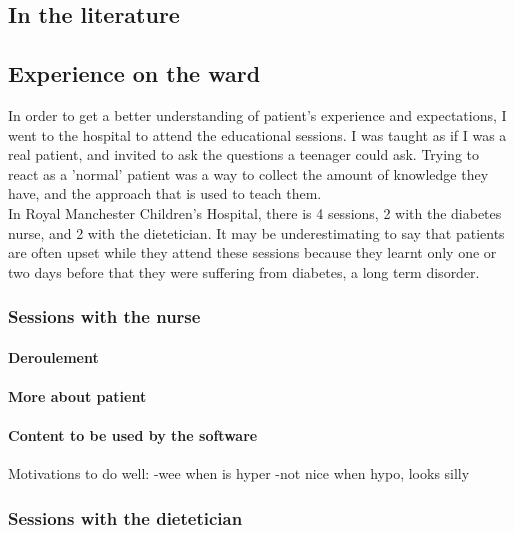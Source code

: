 \subsection{In the literature}
\subsection{Experience on the ward}
In order to get a better understanding of patient's experience and expectations, I went to the hospital to attend the educational sessions. I was taught as if I was a real patient, and invited to ask the questions a teenager could ask. Trying to react as a 'normal' patient was a way to collect the amount of knowledge they have, and the approach that is used to teach them.
\\In Royal Manchester Children’s Hospital, there is 4 sessions, 2 with the diabetes nurse, and 2 with the dietetician. It may be underestimating to say that patients are often upset while they attend these sessions because they learnt only one or two days before that they were suffering from diabetes, a long term disorder.

\subsubsection{Sessions with the nurse}
\paragraph{Deroulement}
\paragraph{More about patient}
\paragraph{Content to be used by the software}
Motivations to do well: 
-wee when is hyper
-not nice when hypo, looks silly

\subsubsection{Sessions with the dietetician}
